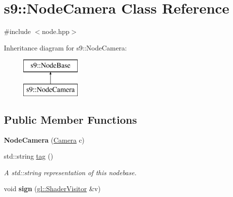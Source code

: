\hypertarget{classs9_1_1NodeCamera}{\section{s9\-:\-:Node\-Camera Class Reference}
\label{classs9_1_1NodeCamera}
}


{\ttfamily \#include $<$node.\-hpp$>$}

Inheritance diagram for s9\-:\-:Node\-Camera\-:\begin{figure}[H]
\begin{center}
\leavevmode
\includegraphics[height=2.000000cm]{classs9_1_1NodeCamera}
\end{center}
\end{figure}
\subsection*{Public Member Functions}
\begin{DoxyCompactItemize}
\item 
\hypertarget{classs9_1_1NodeCamera_a298d8b46e330d24f5410d444705dbe2f}{{\bfseries Node\-Camera} (\hyperlink{classs9_1_1Camera}{Camera} c)}\label{classs9_1_1NodeCamera_a298d8b46e330d24f5410d444705dbe2f}

\item 
\hypertarget{classs9_1_1NodeCamera_afe9b4f4e5ad4abcb43d2bf00148eceb2}{std\-::string \hyperlink{classs9_1_1NodeCamera_afe9b4f4e5ad4abcb43d2bf00148eceb2}{tag} ()}\label{classs9_1_1NodeCamera_afe9b4f4e5ad4abcb43d2bf00148eceb2}

\begin{DoxyCompactList}\small\item\em A std\-::string representation of this nodebase. \end{DoxyCompactList}\item 
\hypertarget{classs9_1_1NodeCamera_a31034accf31ac2711934ef2bce325e85}{void {\bfseries sign} (\hyperlink{classs9_1_1gl_1_1ShaderVisitor}{gl\-::\-Shader\-Visitor} \&v)}\label{classs9_1_1NodeCamera_a31034accf31ac2711934ef2bce325e85}

\end{DoxyCompactItemize}
